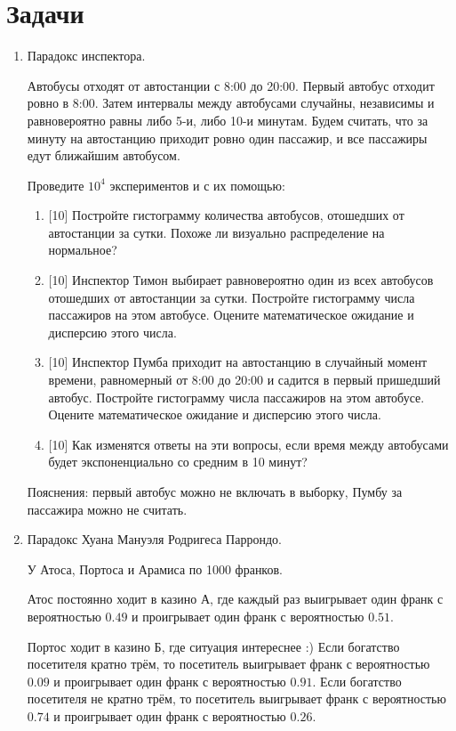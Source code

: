 \documentclass[12pt]{article}
\begin{document}
\section*{Задачи}
\begin{enumerate}
\item Парадокс инспектора. 

Автобусы отходят от автостанции с 8:00 до 20:00. Первый автобус отходит ровно в 8:00. 
Затем интервалы между автобусами случайны, независимы и равновероятно равны либо 5-и, либо 10-и
минутам. 
Будем считать, что за минуту на автостанцию приходит ровно один пассажир, 
и все пассажиры едут ближайшим автобусом.

Проведите $10^4$ экспериментов и с их помощью:

\begin{enumerate}
    \item {[10]} Постройте гистограмму количества автобусов, отошедших от автостанции за сутки. 
    Похоже ли визуально распределение на нормальное?
    \item {[10]} Инспектор Тимон выбирает равновероятно один из всех автобусов отошедших от автостанции за сутки. 
    Постройте гистограмму числа пассажиров на этом автобусе. Оцените математическое ожидание и дисперсию этого числа.
    \item {[10]} Инспектор Пумба приходит на автостанцию в случайный момент времени, равномерный от 8:00 до 20:00 и 
    садится в первый пришедший автобус. Постройте гистограмму числа пассажиров на этом автобусе. Оцените математическое ожидание и дисперсию этого числа.
    \item {[10]} Как изменятся ответы на эти вопросы, если время между автобусами будет экспоненциально со средним в 10 минут?
\end{enumerate}

Пояснения: первый автобус можно не включать в выборку, Пумбу за пассажира можно не считать. 

\newpage
\item Парадокс Хуана Мануэля Родригеса Паррондо.

У Атоса, Портоса и Арамиса по 1000 франков. 

Атос постоянно ходит в казино А, где каждый раз выигрывает один франк с вероятностью $0.49$ и проигрывает 
один франк с вероятностью $0.51$.

Портос ходит в казино Б, где ситуация интереснее :) 
Если богатство посетителя кратно трём, то посетитель выигрывает франк с вероятностью $0.09$ 
и проигрывает один франк с вероятностью $0.91$. 
Если богатство посетителя не кратно трём, то посетитель выигрывает франк с вероятностью $0.74$ 
и проигрывает один франк с вероятностью $0.26$. 


\end{enumerate}
\end{document}
